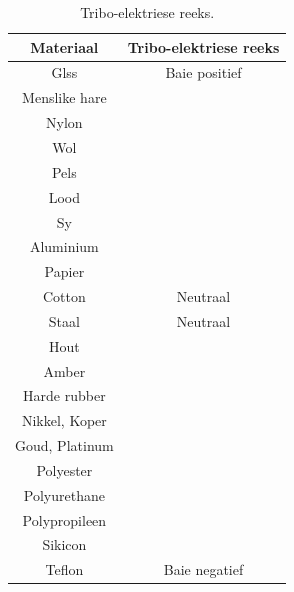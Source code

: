 \begin{minipage}{.55\textwidth}
\begin{center}
\begin{table}[H]
\centering
\begin{tabular}{|cc|}\hline
\textbf{Materiaal}&\textbf{Tribo-elektriese reeks}\\\hline
Glss& Baie positief\\\hline
Menslike hare&\\\hline
Nylon&\\\hline
Wol&\\\hline
Pels&\\\hline
Lood&\\\hline
Sy&\\\hline
Aluminium&\\\hline
Papier&\\\hline
Cotton&Neutraal\\\hline
Staal &Neutraal\\\hline
Hout&\\\hline
Amber&\\\hline
Harde rubber&\\\hline
Nikkel, Koper&\\\hline
Goud, Platinum&\\\hline
Polyester&\\\hline
Polyurethane&\\\hline
Polypropileen&\\\hline
Sikicon&\\\hline
Teflon& Baie negatief\\\hline
\end{tabular}
\caption{Tribo-elektriese reeks.}
\end{table}
\end{center}
\end{minipage}


